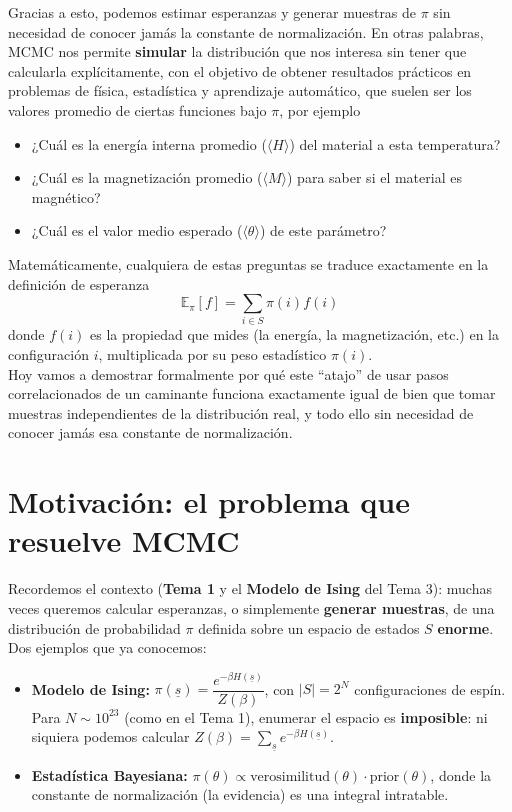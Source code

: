 \noindent
Gracias a esto, podemos estimar esperanzas y generar muestras de $\pi$ sin necesidad de conocer jamás la constante de normalización. En otras palabras, MCMC nos permite \textbf{simular} la distribución que nos interesa sin tener que calcularla explícitamente, con el objetivo de obtener resultados prácticos en problemas de física, estadística y aprendizaje automático, que suelen ser los valores promedio de ciertas funciones bajo $\pi$, por ejemplo
\begin{itemize}
    \item ¿Cuál es la energía interna promedio ($\langle H \rangle$) del material a esta temperatura?
    \item ¿Cuál es la magnetización promedio ($\langle M \rangle$) para saber si el material es magnético?
    \item ¿Cuál es el valor medio esperado ($\langle \theta \rangle$) de este parámetro?
\end{itemize}
Matemáticamente, cualquiera de estas preguntas se traduce exactamente en la definición de esperanza
$$\mathbb{E}_\pi[f] = \sum_{i\in S} \pi(i) f(i)$$
donde $f(i)$ es la propiedad que mides (la energía, la magnetización, etc.) en la configuración $i$, multiplicada por su peso estadístico $\pi(i)$. \\

\noindent
Hoy vamos a demostrar formalmente por qué este ``atajo'' de usar pasos correlacionados de un caminante funciona exactamente igual de bien que tomar muestras independientes de la distribución real, y todo ello sin necesidad de conocer jamás esa constante de normalización.


\section{Motivación: el problema que resuelve MCMC}

\noindent
Recordemos el contexto (\textbf{Tema 1} y el \textbf{Modelo de Ising} del Tema 3): muchas veces queremos calcular esperanzas, o simplemente \textbf{generar muestras}, de una distribución de probabilidad $\pi$ definida sobre un espacio de estados $S$ \textbf{enorme}. Dos ejemplos que ya conocemos:
\begin{itemize}
    \item \textbf{Modelo de Ising:} $\pi(\underline{s}) = \dfrac{e^{-\beta H(\underline{s})}}{Z(\beta)}$, con $|S| = 2^N$ configuraciones de espín. Para $N\sim 10^{23}$ (como en el Tema 1), enumerar el espacio es \textbf{imposible}: ni siquiera podemos calcular $Z(\beta)=\sum_{\underline s} e^{-\beta H(\underline s)}$.
    \item \textbf{Estadística Bayesiana:} $\pi(\theta) \propto \text{verosimilitud}(\theta)\cdot \text{prior}(\theta)$, donde la constante de normalización (la evidencia) es una integral intratable.
\end{itemize}

